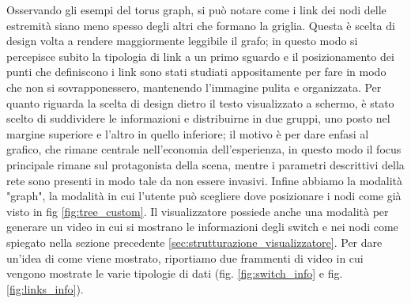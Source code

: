 \documentclass[binding=0.6cm]{sapthesis}
\begin{document}
Osservando gli esempi del torus graph, si può notare come i link dei nodi delle estremità siano meno spesso degli altri che formano la griglia.
Questa è scelta di design volta a rendere maggiormente leggibile il grafo; in questo modo si percepisce subito la tipologia di link a un primo sguardo e il
posizionamento dei punti che definiscono i link sono stati studiati appositamente per fare in modo che non si sovrapponessero, mantenendo l'immagine pulita e organizzata.
Per quanto riguarda la scelta di design dietro il testo visualizzato a schermo, è stato scelto di suddividere le informazioni e distribuirne in due gruppi, uno posto nel margine superiore e l'altro in quello inferiore;
il motivo è per dare enfasi al grafico, che rimane centrale nell'economia dell'esperienza, in questo modo il focus principale rimane sul protagonista della scena, mentre i parametri descrittivi della rete
sono presenti in modo tale da non essere invasivi.
Infine abbiamo la modalità "graph", la modalità in cui l'utente può scegliere dove posizionare i nodi come già visto in fig \ref{fig:tree_custom}.
Il visualizzatore possiede anche una modalità per generare un video in cui si mostrano le informazioni degli switch 
e nei nodi come spiegato nella sezione precedente \ref{sec:strutturazione_visualizzatore}. Per dare un'idea di come viene mostrato, riportiamo due frammenti di video in cui vengono mostrate
le varie tipologie di dati (fig. \ref{fig:switch_info} e fig. \ref{fig:links_info}).
\newline
\newline
\end{document}
